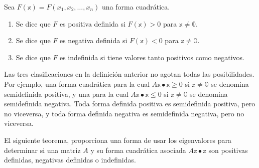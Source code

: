 \begin{definition}
    Sea $F(\mathbb{x})=F\left(x_{1}, x_{2}, \dots, x_{n}\right)$ una forma cuadrática.
    \begin{enumerate}[label=\roman*)]
        \item Se dice que $F$ es positiva definida si $F(\mathbb{x})>0$ para $\mathbb{x} \neq \mathbb{0}$.
        \item Se dice que $F$ es negativa definida si $F(\mathbb{x})<0$ para $\mathbb{x} \neq \mathbb{0}$.
        \item Se dice que $F$ es indefinida si tiene valores tanto positivos como negativos.
    \end{enumerate}
\end{definition}

Las tres clasificaciones en la definición anterior no agotan todas las posibilidades. Por ejemplo, una forma cuadrática para la cual $A\mathbb{x} \bullet \mathbb{x} \geq 0$ si $\mathbb{x} \neq \mathbb{0}$ se denomina semidefinida positiva, y una para la cual $A\mathbb{x} \bullet \mathbb{x} \leq 0$ si $\mathbb{x} \neq \mathbb{0}$ se denomina semidefinida negativa. Toda forma definida positiva es semidefinida positiva, pero no viceversa, y toda forma definida negativa es semidefinida negativa, pero no viceversa.


El siguiente teorema, proporciona una forma de usar los eigenvalores para determinar si una matriz $A$ y su forma cuadrática asociada $A\mathbb{x} \bullet \mathbb{x}$ son positivas definidas, negativas definidas o indefinidas.

